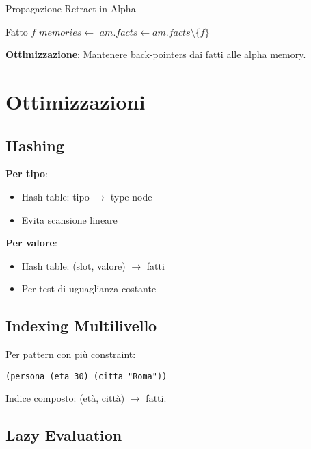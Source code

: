 \begin{algorithm}
\caption{Propagazione Retract in Alpha}
\begin{algorithmic}[1]
\Require Fatto $f$
  \State $memories \gets $ 
    \State $am.facts \gets am.facts \setminus \{f\}$
    \State {}
  \EndFor
\EndFunction
\end{algorithmic}
\end{algorithm}

\textbf{Ottimizzazione}: Mantenere back-pointers dai fatti alle alpha memory.

\section{Ottimizzazioni}

\subsection{Hashing}

\textbf{Per tipo}:
\begin{itemize}
\item Hash table: tipo $\rightarrow$ type node
\item Evita scansione lineare
\end{itemize}

\textbf{Per valore}:
\begin{itemize}
\item Hash table: (slot, valore) $\rightarrow$ fatti
\item Per test di uguaglianza costante
\end{itemize}

\subsection{Indexing Multilivello}

Per pattern con più constraint:

\begin{lstlisting}[language=CLIPS]
(persona (eta 30) (citta "Roma"))
\end{lstlisting}

Indice composto: (età, città) $\rightarrow$ fatti.

\subsection{Lazy Evaluation}

